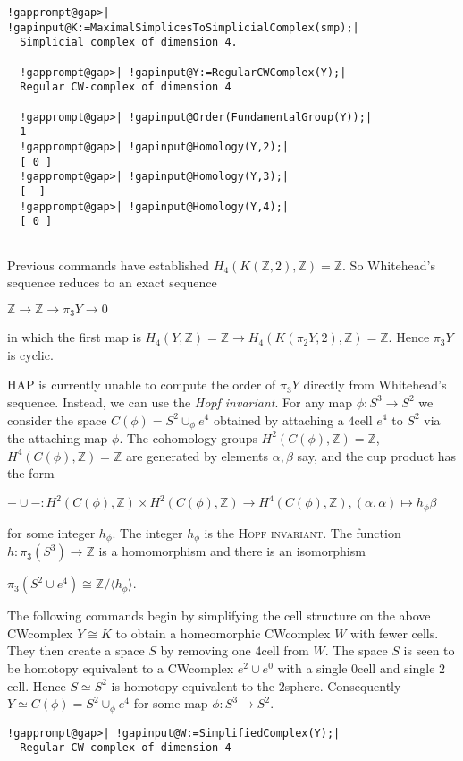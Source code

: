 \documentclass[a4paper,11pt]{report}
\begin{document}
{{{\begin{Verbatim}[commandchars=!@|,fontsize=\small,frame=single,label=Example]
  !gapprompt@gap>| !gapinput@K:=MaximalSimplicesToSimplicialComplex(smp);|
  Simplicial complex of dimension 4.
  
  !gapprompt@gap>| !gapinput@Y:=RegularCWComplex(Y);|
  Regular CW-complex of dimension 4
  
  !gapprompt@gap>| !gapinput@Order(FundamentalGroup(Y));|
  1
  !gapprompt@gap>| !gapinput@Homology(Y,2);|
  [ 0 ]
  !gapprompt@gap>| !gapinput@Homology(Y,3);|
  [  ]
  !gapprompt@gap>| !gapinput@Homology(Y,4);|
  [ 0 ]
  
\end{Verbatim}
 

 Previous commands have established $ H_4(K(\mathbb Z,2), \mathbb Z)=\mathbb Z$. So Whitehead's sequence reduces to an exact sequence 

$\mathbb Z \rightarrow \mathbb Z \rightarrow \pi_3Y \rightarrow 0$ 

in which the first map is $ H_4(Y,\mathbb Z)=\mathbb Z \rightarrow H_4(K(\pi_2Y,2), \mathbb Z )=\mathbb Z $. Hence $\pi_3Y$ is cyclic. 

 HAP is currently unable to compute the order of $\pi_3Y$ directly from Whitehead's sequence. Instead, we can use the \emph{Hopf invariant}. For any map $\phi\colon S^3 \rightarrow S^2$ we consider the space $C(\phi) = S^2 \cup_\phi e^4$ obtained by attaching a $4$\texttt{}cell $e^4$ to $S^2$ via the attaching map $\phi$. The cohomology groups $H^2(C(\phi),\mathbb Z)=\mathbb Z$, $H^4(C(\phi),\mathbb Z)=\mathbb Z$ are generated by elements $\alpha, \beta$ say, and the cup product has the form 

$- \cup -\colon H^2(C(\phi),\mathbb Z)\times H^2(C(\phi),\mathbb Z) \rightarrow
H^4(C(\phi),\mathbb Z), (\alpha,\alpha) \mapsto h_\phi \beta$ 

for some integer $h_\phi$. The integer $h_\phi$ is the \textsc{Hopf invariant}. The function $h\colon \pi_3(S^3)\rightarrow \mathbb Z$ is a homomorphism and there is an isomorphism 

$\pi_3(S^2\cup e^4) \cong \mathbb Z/\langle h_\phi\rangle$. 

The following commands begin by simplifying the cell structure on the above
CW\texttt{}complex $Y\cong K$ to obtain a homeomorphic CW\texttt{}complex $W$ with fewer cells. They then create a space $S$ by removing one $4$\texttt{}cell from $W$. The space $S$ is seen to be homotopy equivalent to a CW\texttt{}complex $e^2\cup e^0$ with a single $0$\texttt{}cell and single $2$\texttt{}cell. Hence $S\simeq S^2$ is homotopy equivalent to the $2$\texttt{}sphere. Consequently $Y \simeq C(\phi ) = S^2\cup_\phi e^4 $ for some map $\phi\colon S^3 \rightarrow S^2$. 
\begin{Verbatim}[commandchars=!@|,fontsize=\small,frame=single,label=Example]
  !gapprompt@gap>| !gapinput@W:=SimplifiedComplex(Y);|
  Regular CW-complex of dimension 4
  

\end{Verbatim}}}}
\end{document}
